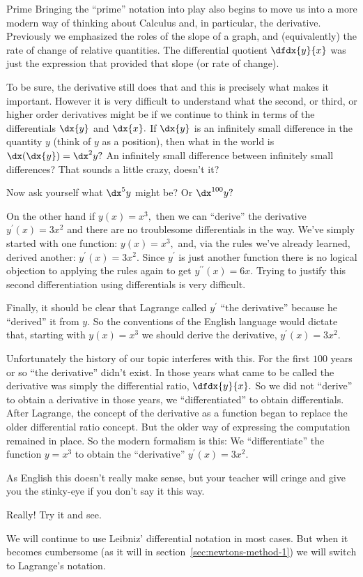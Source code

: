 \begin{mynotation}{Prime}
  Bringing the ``prime'' notation into play also begins to move us
  into a more modern way of thinking about Calculus and, in
  particular, the derivative. Previously we emphasized the roles of
  the slope of a graph, and (equivalently) the rate of change of
  relative quantities. The differential quotient $\dfdx{y}{x}$ was just
  the expression that provided that slope (or rate of change).

  To be sure, the derivative still does that and this is
  precisely what makes it important. However it is very difficult to
  understand what the  second, or third, or higher order derivatives
  might be if we continue to think in terms of the differentials
  $\dx{y}$ and $\dx{x}.$ If $\dx{y}$ is an infinitely small difference
  in the quantity $y$ (think of $y$ as a position), then what in the
  world is $\dx(\dx{y})=\dx^2{y}?$ An infinitely small difference
  between infinitely small differences? That sounds a little crazy,
  doesn't it?

  Now ask yourself what $\dx^5y$ might be? Or $\dx^{100}y?$

  On the other hand if $y(x) = x^3,$ then we can ``derive'' the
  derivative $y^\prime(x)=3x^2$ and there are no troublesome
  differentials in the way. We've simply started with one function:
  $y(x) = x^3,$ and, via the rules we've already learned, derived
  another: $y^\prime(x) = 3x^2.$ Since $y^\prime$ is just another
  function there is no logical objection to applying the rules again
  to get $y^{\prime\prime}(x) = 6x.$ Trying to justify this second
  differentiation using differentials is very difficult.

  Finally, it should be clear that Lagrange called $y^\prime$ ``the
  derivative'' because he ``derived'' it from $y.$ So the
  conventions of the English language would dictate that, starting
  with $y(x)=x^3$ we should derive the derivative, $y^\prime(x)=3x^2.$

  Unfortunately the history of our topic interferes with this.  For
  the first $100$ years or so ``the derivative'' didn't exist. In
  those years what came to be called the derivative was simply the
  differential ratio, $\dfdx{y}{x}.$ So we did not ``derive'' to obtain
  a derivative in those years, we ``differentiated'' to obtain
  differentials. After Lagrange, the concept of the derivative as a function
  began to replace the older differential ratio concept. But the
  older way of expressing the computation remained in place. So the modern
  formalism is this: We ``differentiate'' the function $y=x^3$ to
  obtain the ``derivative'' $y^\prime(x)=3x^2.$

  As English this doesn't really make sense, but your teacher will cringe and
  give you the stinky-eye if you don't say it this way.

  Really! Try it and see.

  We will continue to use Leibniz' differential notation in most
  cases. But when it becomes cumbersome (as it will in
  section~\ref{sec:newtons-method-1}) we will switch to Lagrange's
  notation.
\end{mynotation}

